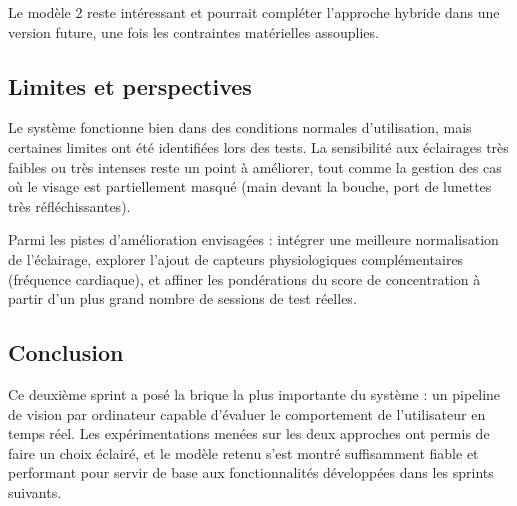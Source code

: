 Le modèle 2 reste intéressant et pourrait compléter l’approche hybride dans une version future, une fois les contraintes matérielles assouplies.

\subsection{Limites et perspectives}

Le système fonctionne bien dans des conditions normales d’utilisation, mais certaines limites ont été identifiées lors des tests. La sensibilité aux éclairages très faibles ou très intenses reste un point à améliorer, tout comme la gestion des cas où le visage est partiellement masqué (main devant la bouche, port de lunettes très réfléchissantes).

Parmi les pistes d’amélioration envisagées : intégrer une meilleure normalisation de l’éclairage, explorer l’ajout de capteurs physiologiques complémentaires (fréquence cardiaque), et affiner les pondérations du score de concentration à partir d’un plus grand nombre de sessions de test réelles.

\subsection{Conclusion}

Ce deuxième sprint a posé la brique la plus importante du système : un pipeline de vision par ordinateur capable d’évaluer le comportement de l’utilisateur en temps réel. Les expérimentations menées sur les deux approches ont permis de faire un choix éclairé, et le modèle retenu s’est montré suffisamment fiable et performant pour servir de base aux fonctionnalités développées dans les sprints suivants.